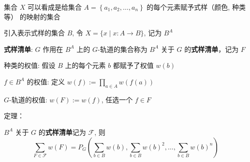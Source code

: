 集合 $X$ 可以看成是给集合 $A=\left\{a_{1}, a_{2}, \ldots, a_{n}\right\}$ 的每个元素赋予式样（颜色, 种类等） 的映射的集合

引入表示式样的集合 $B$, 令 $X=\{x \mid x: A \rightarrow B\}$, 记为 $B^{A}$

\textbf{式样清单}: $G$ 作用在 $B^{A}$ 上的 $G$-轨道的集合称为 $B^{A}$ 关于 $G$ 的\textbf{式样清单}，记为 $F$

种类的权值: 假设 $B$ 上的每个元素 $b$ 都赋予了权值 $w(b)$

$f \in B^{A}$ 的权值: 定义 $w(f):=\prod_{a \in A} w(f(a))$

$G$-轨道的权值: $w(F):=w(f)$, 任选一个 $f \in F$

定理：

$B^{A}$ 关于 $G$ 的\textbf{式样清单}记为 $\mathcal{F}$, 则
$$
\sum_{F \in \mathcal{F}} w(F)=P_{G}\left(\sum_{b \in B} w(b), \sum_{b \in B} w(b)^{2}, \ldots, \sum_{b \in B} w(b)^{n}\right)
$$